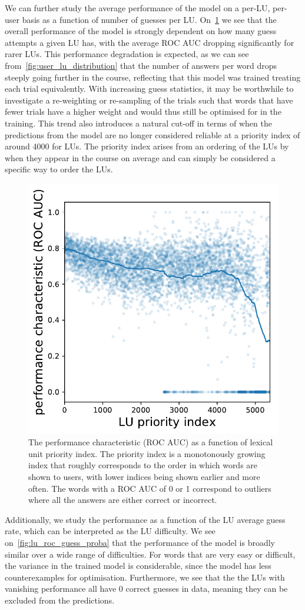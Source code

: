 We can further study the average performance of the model on a per-LU, per-user basis as a function of number of guesses per LU. On~\cref{fig:lu_roc_prio} we see that the overall performance of the model is strongly dependent on how many guess attempts a given LU has, with the average ROC AUC dropping significantly for rarer LUs. This performance degradation is expected, as we can see from~\cref{fig:user_lu_distribution} that the number of answers per word drops steeply going further in the course, reflecting that this model was trained treating each trial equivalently. With increasing guess statistics, it may be worthwhile to investigate a re-weighting or re-sampling of the trials such that words that have fewer trials have a higher weight and would thus still be optimised for in the training. This trend also introduces a natural cut-off in terms of when the predictions from the model are no longer considered reliable at a priority index of around 4000 for LUs. The priority index arises from an ordering of the LUs by when they appear in the course on average and can simply be considered a specific way to order the LUs.

\begin{figure}[ht]
\centering
\includegraphics[width=0.5\linewidth]{figures/lingvist/lu_roc_prio.pdf}
\caption[Performance of knowledge estimation as a function of LU priority.]{The performance characteristic (ROC AUC) as a function of lexical unit priority index. The priority index is a monotonously growing index that roughly corresponds to the order in which words are shown to users, with lower indices being shown earlier and more often. The words with a ROC AUC of 0 or 1 correspond to outliers where all the answers are either correct or incorrect.}
\label{fig:lu_roc_prio}
\end{figure}

Additionally, we study the performance as a function of the LU average guess rate, which can be interpreted as the LU difficulty. We see on~\cref{fig:lu_roc_guess_proba} that the performance of the model is broadly similar over a wide range of difficulties. For words that are very easy or difficult, the variance in the trained model is considerable, since the model has less counterexamples for optimisation. Furthermore, we see that the the LUs with vanishing performance all have 0 correct guesses in data, meaning they can be excluded from the predictions.


